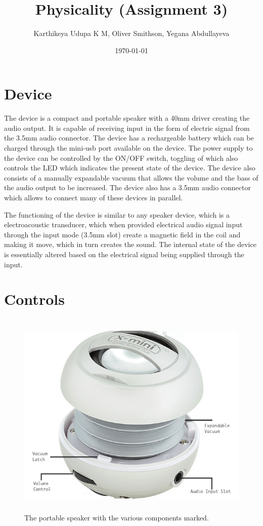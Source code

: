 \documentclass[10pt,a4paper]{article}
\title{Physicality (Assignment 3) }
\author{Karthikeya Udupa K M, Oliver Smithson, Yegana Abdullayeva}
\date{\today}
\begin{document}
 

\maketitle
\noindent


\section{Device}
The device is a compact and portable speaker with a 40mm driver creating the audio output. It is capable of receiving input in the form of electric signal from the 3.5mm audio connector. The device has a rechargeable battery which can be charged through the mini-usb port available on the device. The power supply to the device can be controlled by the ON/OFF switch, toggling of which also controls the LED which indicates the present state of the device. The device also consists of a manually expandable vacuum that allows the volume and the bass of the audio output to be increased. The device also has a 3.5mm audio connector which allows to connect many of these devices in parallel.

The functioning of the device is similar to any speaker device, which is a electroacoustic transducer, which when provided electrical audio signal input through the input mode (3.5mm slot) create a magnetic field in the coil and making it move, which in turn creates the sound. The internal state of the device is essentially altered based on the electrical signal being supplied through the input. 

\section{Controls}
\begin{figure}[hbpt]
\centerline{\includegraphics[width=15cm,height=10cm,keepaspectratio]{DW1}}
\caption {The portable speaker with the various components marked.}
\label{physical_state_power_switch}
\end{figure}
\end{document}
